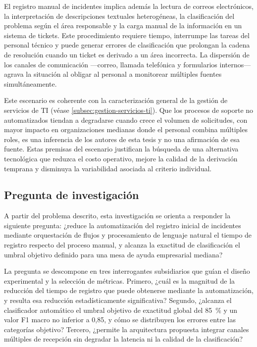 El registro manual de incidentes implica además la lectura de correos electrónicos, la interpretación de descripciones textuales heterogéneas, la clasificación del problema según el área responsable y la carga manual de la información en un sistema de tickets. Este procedimiento requiere tiempo, interrumpe las tareas del personal técnico y puede generar errores de clasificación que prolongan la cadena de resolución cuando un ticket es derivado a un área incorrecta. La dispersión de los canales de comunicación ---correo, llamada telefónica y formularios internos--- agrava la situación al obligar al personal a monitorear múltiples fuentes simultáneamente.

Este escenario es coherente con la caracterización general de la gestión de servicios de TI \parencite{Galup2009_itsm} (véase \autoref{subsec:gestion-servicios-ti}). Que los procesos de soporte no automatizados tiendan a degradarse cuando crece el volumen de solicitudes, con mayor impacto en organizaciones medianas donde el personal combina múltiples roles, es una inferencia de los autores de esta tesis y no una afirmación de esa fuente. Estas premisas del escenario justifican la búsqueda de una alternativa tecnológica que reduzca el costo operativo, mejore la calidad de la derivación temprana y disminuya la variabilidad asociada al criterio individual.

\subsection{Pregunta de investigación}\label{subsec:pregunta-investigacion}

A partir del problema descrito, esta investigación se orienta a responder la siguiente pregunta: ¿reduce la automatización del registro inicial de incidentes mediante orquestación de flujos y procesamiento de lenguaje natural el tiempo de registro respecto del proceso manual, y alcanza la exactitud de clasificación el umbral objetivo definido para una mesa de ayuda empresarial mediana?

La pregunta se descompone en tres interrogantes subsidiarios que guían el diseño experimental y la selección de métricas. Primero, ¿cuál es la magnitud de la reducción del tiempo de registro que puede obtenerse mediante la automatización, y resulta esa reducción estadísticamente significativa? Segundo, ¿alcanza el clasificador automático el umbral objetivo de exactitud global del 85~\% y un valor F1 macro no inferior a 0,85, y cómo se distribuyen los errores entre las categorías objetivo? Tercero, ¿permite la arquitectura propuesta integrar canales múltiples de recepción sin degradar la latencia ni la calidad de la clasificación?

